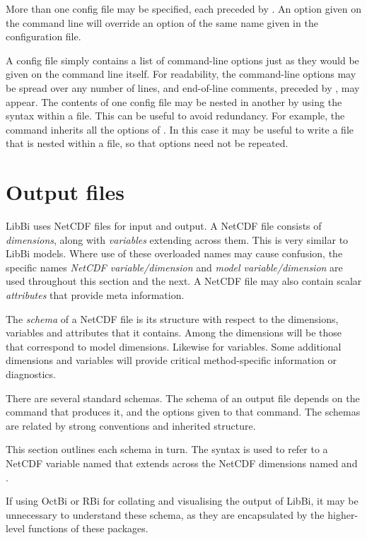 More than one config file may be specified, each preceded by . An
option given on the command line will override an option of the same name
given in the configuration file.

A config file simply contains a list of command-line options just as they
would be given on the command line itself. For readability, the command-line
options may be spread over any number of lines, and end-of-line comments,
preceded by \bitt{\#}, may appear. The contents of one config file may be
nested in another by using the  syntax within a file. This
can be useful to avoid redundancy. For example, the  command
inherits all the options of . In this case it may be useful
to write a  file that is nested within a 
file, so that options need not be repeated.

\section{Output files}

LibBi uses NetCDF files for input and output. A
NetCDF file consists of \emph{dimensions}, along with \emph{variables}
extending across them. This is very similar to LibBi models. Where use of
these overloaded names may cause confusion, the specific names \emph{NetCDF
  variable/dimension} and \emph{model variable/dimension} are used throughout
this section and the next. A NetCDF file may also contain scalar
\emph{attributes} that provide meta information.

The \emph{schema} of a NetCDF file is its structure with respect to the
dimensions, variables and attributes that it contains. Among the dimensions
will be those that correspond to model dimensions. Likewise for
variables. Some additional dimensions and variables will provide critical
method-specific information or diagnostics.

There are several standard schemas. The schema of an output file depends on
the command that produces it, and the options given to that command. The
schemas are related by strong conventions and inherited structure.

This section outlines each schema in turn. The syntax  is used to
refer to a NetCDF variable named  that extends across the NetCDF
dimensions named  and .

\begin{tip}
If using OctBi or RBi for collating and visualising the output of LibBi, it
may be unnecessary to understand these schema, as they are encapsulated by
the higher-level functions of these packages.
\end{tip}

